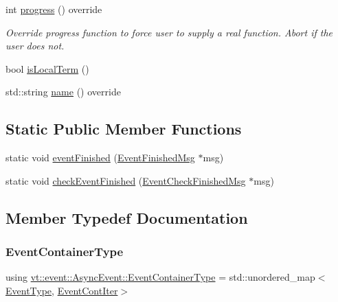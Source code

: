\begin{DoxyCompactItemize}
\item 
int \hyperlink{structvt_1_1event_1_1_async_event_a36f18429bc2856a30c8f7fd70654e0a4}{progress} () override
\begin{DoxyCompactList}\small\item\em Override progress function to force user to supply a real function. Abort if the user does not. \end{DoxyCompactList}\item 
bool \hyperlink{structvt_1_1event_1_1_async_event_a10af2d5cb5318e2ef25eabcd88c8139a}{is\+Local\+Term} ()
\item 
std\+::string \hyperlink{structvt_1_1event_1_1_async_event_ac68b97804ca9b3dab1785a3c8a5d8242}{name} () override
\end{DoxyCompactItemize}
\subsection*{Static Public Member Functions}
\begin{DoxyCompactItemize}
\item 
static void \hyperlink{structvt_1_1event_1_1_async_event_a2228d79f1c1f838e630dcb3325edfde3}{event\+Finished} (\hyperlink{structvt_1_1_event_finished_msg}{Event\+Finished\+Msg} $\ast$msg)
\item 
static void \hyperlink{structvt_1_1event_1_1_async_event_a5493f4402db0fffba5300246247523b9}{check\+Event\+Finished} (\hyperlink{structvt_1_1_event_check_finished_msg}{Event\+Check\+Finished\+Msg} $\ast$msg)
\end{DoxyCompactItemize}


\subsection{Member Typedef Documentation}
\mbox{\label{structvt_1_1event_1_1_async_event_a391e9ac6236bd3dc5c884b8bc7e48257}} 
\subsubsection{\texorpdfstring{Event\+Container\+Type}{EventContainerType}}
{\footnotesize\ttfamily using \hyperlink{structvt_1_1event_1_1_async_event_a391e9ac6236bd3dc5c884b8bc7e48257}{vt\+::event\+::\+Async\+Event\+::\+Event\+Container\+Type} =  std\+::unordered\+\_\+map$<$\hyperlink{namespacevt_a009267401def7ae8bf201892222d060f}{Event\+Type}, \hyperlink{structvt_1_1event_1_1_async_event_a0f9634db3d6887c4a22076f6b9054e93}{Event\+Cont\+Iter}$>$}


